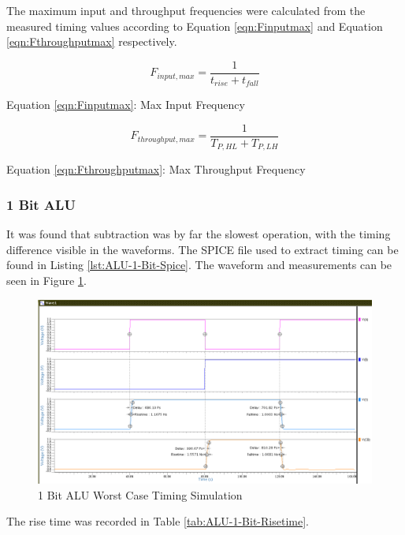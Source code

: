 \documentclass[11pt]{article}
\begin{document}
		
		The maximum input and throughput frequencies were calculated from the measured timing values according to Equation \ref{eqn:Finputmax} and Equation \ref{eqn:Fthroughputmax} respectively. 
		
		\begin{equation}\label{eqn:Finputmax}
		F_{input,max} = \frac{1}{t_{rise}+t_{fall}}
		\end{equation}
		\begin{center}
			Equation \ref{eqn:Finputmax}: Max Input Frequency
		\end{center}
		
		\begin{equation}\label{eqn:Fthroughputmax}
		F_{throughput,max} = \frac{1}{T_{P,HL}+T_{P,LH}}
		\end{equation}
		\begin{center}
			Equation \ref{eqn:Fthroughputmax}: Max Throughput Frequency
		\end{center}
	
		\subsubsection{1 Bit ALU}
			It was found that subtraction was by far the slowest operation, with the timing difference visible in the waveforms.  The SPICE file used to extract timing can be found in Listing \ref{lst:ALU-1-Bit-Spice}. The waveform and measurements can be seen in Figure \ref{fig:alu1bit-timing}.
		
			\begin{figure}[H]
				\centering
				\includegraphics[width=1\linewidth]{"Pictures/ALU_1Bit Timing"}
				\caption{1 Bit ALU Worst Case Timing Simulation}
				\label{fig:alu1bit-timing}
			\end{figure}
		
			The rise time was recorded in Table \ref{tab:ALU-1-Bit-Risetime}.
			
\end{document}
